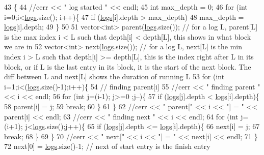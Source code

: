 \begin{DoxyCode}
43                 \{
44   \textcolor{comment}{//cerr << " log started " << endl;}
45   \textcolor{keywordtype}{int} max\_depth = 0;
46   \textcolor{keywordflow}{for} (\textcolor{keywordtype}{int} i=0;i<\hyperlink{classlogger_a46e89697a97bc41a90ec78763bfe4d39}{logs}.size(); i++)\{
47     \textcolor{keywordflow}{if} (\hyperlink{classlogger_a46e89697a97bc41a90ec78763bfe4d39}{logs}[i].depth > max\_depth)
48       max\_depth = \hyperlink{classlogger_a46e89697a97bc41a90ec78763bfe4d39}{logs}[i].depth;
49   \}
50 
51   vector<int> parent(\hyperlink{classlogger_a46e89697a97bc41a90ec78763bfe4d39}{logs}.size()); \textcolor{comment}{// for a log L, parent[L] is the max index i < L such that depth[i]
       < depth[L], this shows in what block we are in}
52   vector<int> next(\hyperlink{classlogger_a46e89697a97bc41a90ec78763bfe4d39}{logs}.size()); \textcolor{comment}{// for a log L, next[L] is the min index i > L such that depth[i] >=
       depth[L], this is the index right after L in its block, or if L is the last entry in its block, it is the
       start of the next block. The diff between L and next[L] shows the duration of running L}
53   \textcolor{keywordflow}{for} (\textcolor{keywordtype}{int} i=1;i<(\hyperlink{classlogger_a46e89697a97bc41a90ec78763bfe4d39}{logs}.size()-1);i++)\{
54     \textcolor{comment}{// finding parent[i]}
55     \textcolor{comment}{//cerr << " finding parent " << i << endl;}
56     \textcolor{keywordflow}{for} (\textcolor{keywordtype}{int} j=(i-1); j>=0 ;j--)\{
57       \textcolor{keywordflow}{if} (\hyperlink{classlogger_a46e89697a97bc41a90ec78763bfe4d39}{logs}[j].depth < \hyperlink{classlogger_a46e89697a97bc41a90ec78763bfe4d39}{logs}[i].depth)\{
58         parent[i] = j;
59         \textcolor{keywordflow}{break};
60       \}
61     \}
62     \textcolor{comment}{//cerr << " parent[" << i << "] = " << parent[i] << endl;}
63     \textcolor{comment}{//cerr << " finding next " << i << endl;}
64     \textcolor{keywordflow}{for} (\textcolor{keywordtype}{int} j=(i+1); j<\hyperlink{classlogger_a46e89697a97bc41a90ec78763bfe4d39}{logs}.size();j++)\{
65       \textcolor{keywordflow}{if} (\hyperlink{classlogger_a46e89697a97bc41a90ec78763bfe4d39}{logs}[j].depth <= \hyperlink{classlogger_a46e89697a97bc41a90ec78763bfe4d39}{logs}[i].depth)\{
66         next[i] = j;
67         \textcolor{keywordflow}{break};
68       \}
69     \}
70     \textcolor{comment}{//cerr << " next[" << i << "] = " << next[i] << endl;}
71   \}
72   next[0] = \hyperlink{classlogger_a46e89697a97bc41a90ec78763bfe4d39}{logs}.size()-1; \textcolor{comment}{// next of start entry is the finish entry}

\end{DoxyCode}
